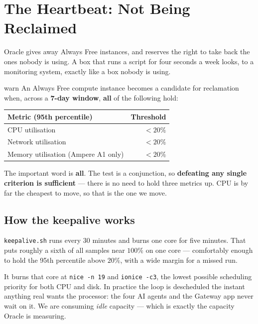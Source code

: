 \documentclass[11pt,a4paper]{article}
\begin{document}
\section{The Heartbeat: Not Being Reclaimed}

Oracle gives away Always Free instances, and reserves the right to take
back the ones nobody is using. A box that runs a script for four seconds
a week looks, to a monitoring system, exactly like a box nobody is
using.

\begin{resultbox}{warn}
An Always Free compute instance becomes a candidate for reclamation
when, across a \textbf{7-day window}, \textbf{all} of the following
hold:

\vspace{0.4em}
\centering
\begin{tabular}{@{}lr@{}}
    \toprule
    \textbf{Metric (95th percentile)} & \textbf{Threshold} \\
    \midrule
    CPU utilisation                     & $< 20\%$ \\
    Network utilisation                 & $< 20\%$ \\
    Memory utilisation (Ampere A1 only) & $< 20\%$ \\
    \bottomrule
\end{tabular}

\vspace{0.6em}
\raggedright
The important word is \textbf{all}. The test is a conjunction, so
\textbf{defeating any single criterion is sufficient} --- there is no
need to hold three metrics up. CPU is by far the cheapest to move, so
that is the one we move.
\end{resultbox}

\subsection{How the keepalive works}

\texttt{keepalive.sh} runs every 30 minutes and burns one core for five
minutes. That puts roughly a sixth of all samples near $100\%$ on one
core --- comfortably enough to hold the 95th percentile above $20\%$,
with a wide margin for a missed run.

It burns that core at \texttt{nice -n 19} and \texttt{ionice -c3}, the
lowest possible scheduling priority for both CPU and disk. In practice
the loop is descheduled the instant anything real wants the processor:
the four AI agents and the Gateway app never wait on it. We are
consuming \emph{idle} capacity --- which is exactly the capacity Oracle
is measuring.
\end{document}
